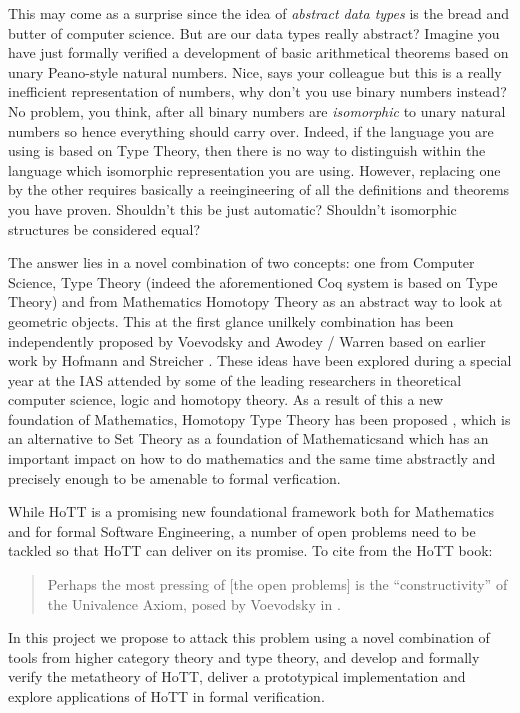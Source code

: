 \documentclass[twocolumn,a4paper,11pt]{article}
\begin{document}
This may come as a surprise since the idea of \emph{abstract data
  types} is the bread and butter of computer science. But are our data
types really abstract? Imagine you have just formally verified a
development of basic arithmetical theorems based on unary Peano-style
natural numbers. Nice, says your colleague but this is a really
inefficient representation of numbers, why don't you use binary
numbers instead? No problem, you think, after all binary numbers are
\emph{isomorphic} to unary natural numbers so hence everything should
carry over. Indeed, if the language you are using is based on Type
Theory, then there is no way to distinguish within the language which
isomorphic representation you are using. However, replacing one by the other
requires basically a reeingineering of all the definitions and
theorems you have proven. Shouldn't this be just automatic? Shouldn't
isomorphic structures be considered equal?

The answer lies in a novel combination of two concepts: one from
Computer Science, Type Theory (indeed the aforementioned Coq system is
based on Type Theory) and from Mathematics Homotopy Theory as an
abstract way to look at geometric objects. This at the first glance
unilkely combination has been independently proposed by Voevodsky and
Awodey / Warren
\cite{voevodsky:very-short-note,awodeyWarren:HTmodelsOfIT} based on
earlier work by Hofmann and Streicher \cite{hofmannStreicher:groupoids}. These
ideas have been explored during a special year at the IAS attended by
some of the leading researchers in theoretical computer science, logic
and homotopy theory. As a result of this a new foundation of
Mathematics, Homotopy Type Theory has been proposed \cite{hott-book},
which is an alternative to Set Theory as a foundation of
Mathematicsand which has an important impact on how to do mathematics
and the same time abstractly and precisely enough to be amenable to
formal verfication.

While HoTT is a promising new foundational framework both for
Mathematics and for formal Software Engineering, a number of
open problems need to be tackled so that HoTT can deliver on its
promise. To cite from the HoTT book:
\begin{quote}
  Perhaps the most pressing of [the open problems] is the
  “constructivity” of the Univalence Axiom, posed by Voevodsky in
  \cite{Voe12,trimble:tetracategories}.
\end{quote}
In this project we propose to attack this problem using a
novel combination of tools from higher category theory and type
theory, and  develop and formally verify the metatheory of
HoTT, deliver a prototypical implementation and explore applications
of HoTT in formal verification.
\end{document}
